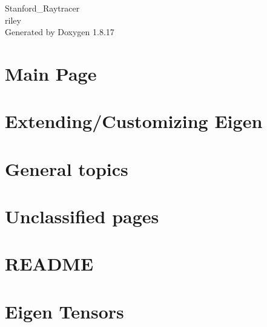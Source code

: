 \let\mypdfximage\pdfximage\def\pdfximage{\immediate\mypdfximage}\documentclass[twoside]{book}
\newcommand{\+}{\discretionary{\mbox{\scriptsize$\hookleftarrow$}}{}{}}
\newcommand{\clearemptydoublepage}{%
  \newpage{\pagestyle{empty}\cleardoublepage}%
}
\begin{document}
\hypersetup{pageanchor=false,
             bookmarksnumbered=true,
             pdfencoding=unicode
            }
\begin{titlepage}
\vspace*{7cm}
\begin{center}%
{\Large Stanford\+\_\+\+Raytracer \\[1ex]\large riley }\\
\vspace*{1cm}
{\large Generated by Doxygen 1.8.17}\\
\end{center}
\end{titlepage}
\clearemptydoublepage
{}
\tableofcontents
\clearemptydoublepage
{}
\hypersetup{pageanchor=true}

\chapter{Main Page}
\label{index}\hypertarget{index}{}
\chapter{Extending/\+Customizing Eigen}
\label{_user_manual__customizing_eigen}

\chapter{General topics}
\label{_user_manual__generalities}

\chapter{Unclassified pages}
\label{_unclassified_pages}

\chapter{R\+E\+A\+D\+ME}
\label{md___users_rileyannereid__pycharm_projects__stanford__raytracer_damping_lib_eigen__r_e_a_d_m_e}

\chapter{Eigen Tensors}
\label{eigen_tensors}

\end{document}
